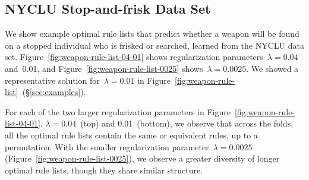 \documentclass[twoside,11pt]{article}
\def\Reg{{\lambda}}
\begin{document}
\clearpage
\subsection{NYCLU Stop-and-frisk Data Set}
We show example optimal rule lists that predict whether a weapon
will be found on a stopped individual who is frisked or searched, learned from the NYCLU data set.
%
Figure~\ref{fig:weapon-rule-list-04-01} shows
regularization parameters~${\Reg = 0.04}$ and~0.01,
and Figure~\ref{fig:weapon-rule-list-0025} shows~${\Reg = 0.0025}$.
%
We showed a representative solution for~${\Reg = 0.01}$ in
Figure~\ref{fig:weapon-rule-list}~(\S\ref{sec:examples}).

For each of the two larger regularization parameters in Figure~\ref{fig:weapon-rule-list-04-01},
${\Reg = 0.04}$~(top) and 0.01~(bottom), we observe that across the folds,
all the optimal rule lists contain the same or equivalent rules, up to a permutation.
%
With the smaller regularization parameter~${\Reg = 0.0025}$ (Figure~\ref{fig:weapon-rule-list-0025}),
we observe a greater diversity of longer optimal rule lists, though they share similar structure.
\end{document}
